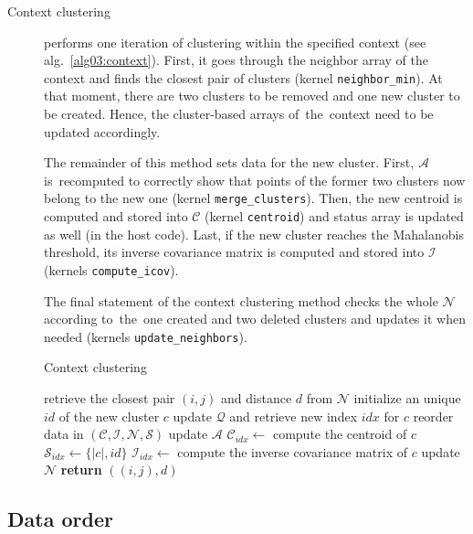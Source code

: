 \begin{description}
	\item[Context clustering] performs one iteration of clustering within the specified context (see alg.~\ref{alg03:context}). First, it goes through the neighbor array of the context and finds the closest pair of clusters (kernel \texttt{neighbor\_min}). At that moment, there are two clusters to be removed and one new cluster to be created. Hence, the cluster-based arrays of~the~context need to be updated accordingly.
	
	The remainder of this method sets data for the new cluster. First, $\mathcal{A}$ is~recomputed to correctly show that points of the former two clusters now belong to the new one (kernel \texttt{merge\_clusters}). Then, the new centroid is computed and stored into $\mathcal{C}$ (kernel \texttt{centroid}) and status array is updated as well (in the host code). Last, if the new cluster reaches the Mahalanobis threshold, its inverse covariance matrix is computed and stored into $\mathcal{I}$ (kernels \texttt{compute\_icov}). 
	
	The final statement of the context clustering method checks the whole $\mathcal{N}$  according to~the~one created and two deleted clusters and updates it when needed (kernels \texttt{update\_neighbors}).
	
	\begin{algorithm}
	\caption{Context clustering}
	\label{alg03:context}
	\begin{algorithmic}[1]
		\State retrieve the closest pair $(i,j)$ and distance $d$ from $\mathcal{N}$
		\State initialize an unique $id$ of the new cluster $c$
		\State update $\mathcal{Q}$ and retrieve new index $idx$ for $c$
		\State reorder data in $(\mathcal{C},\mathcal{I},\mathcal{N},\mathcal{S})$
		\State update $\mathcal{A}$
		\State $\mathcal{C}_{idx} \gets$ compute the centroid of $c$
		\State $\mathcal{S}_{idx} \gets \{|c|, id\}$
		\State $\mathcal{I}_{idx} \gets$ compute the inverse covariance matrix of $c$
		\EndIf
		\State update $\mathcal{N}$
		\State \textbf{return} $((i,j),d)$
		\EndProcedure
	\end{algorithmic}
\end{algorithm}

\end{description}


\subsection{Data order}

